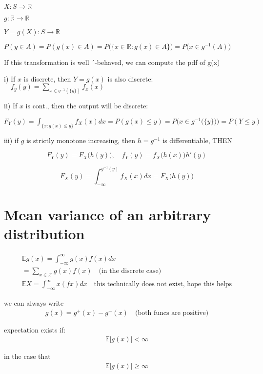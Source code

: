 \documentclass[10pt]{article}
\begin{document}
$X: S \to \mathbb{R}$

$g: \mathbb{R} \to \mathbb{R}$

$Y = g(X) : S \to \mathbb{R}$

$P(y \in A) = P(g(x) \in A) = P\big(\{x \in \mathbb{R}: g(x) \in A\}\big) = P\big(x \in g^{-1}(A)\big)$

If this transformation is well ´-behaved, we can compute the pdf of g(x)

i) If $x$ is discrete, then $Y = g(x)$ is also discrete: $\quad f_y(y) = \sum_{x \in g^{-1}(\{y\})} f_x(x)$

ii) If $x$ is cont., then the output will be discrete: 

$F_Y(y) = \int_{\{x: g(x) \leq y\}}f_X(x)dx = P(g(x) \leq y) = P\Big(x \in g^{-1}\big(\{y\}\big)\Big) = P(Y \leq y)$

iii) if $g$ is strictly monotone increasing, then $h = g^{-1}$ is differentiable, THEN 

$$
F_Y(y) = F_X\big(h(y)\big), \quad f_Y(y) = f_X\big(h(x)\big)h'(y)
$$

$$
F_X(y) = \int_{-\infty}^{g^{-1}(y)}f_X(x)dx = F_X\big(h(y)\big)
$$

\newpage

\section{Mean variance of an arbitrary distribution}

\begin{align*}
    \mathbb{E}g(x) = \int_{-\infty}^{\infty}g(x)f(x)dx\\
    = \sum_{x \in \mathcal{X}}g(x)f(x) \quad\text{(in the discrete case)}\\
    \mathbb{E}X = \int_{-\infty}^{\infty}x(fx)dx\quad\text{{this technically does not exist, hope this helps}}
\end{align*}

we can always write 
\begin{align*}
    g(x) = g^+(x) - g^-(x)\quad\text{(both funcs are positive)}
\end{align*}

expectation exists if: 
\begin{align*}
    \mathbb{E} |g(x)| < \infty
\end{align*}

in the case that 
\begin{align*}
    \mathbb{E} |g(x)| \geq \infty
\end{align*}
\end{document}
